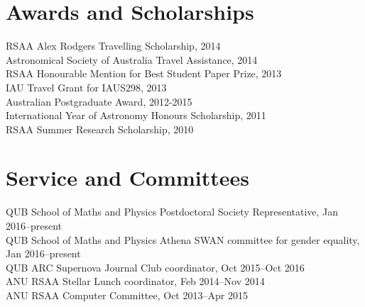 \documentclass[11pt]{res} %
\begin{document}
\begin{resume}
\section{Awards and Scholarships}
  RSAA Alex Rodgers Travelling Scholarship, 2014\\
  Astronomical Society of Australia Travel Assistance, 2014\\
  RSAA Honourable Mention for Best Student Paper Prize, 2013\\
  IAU Travel Grant for IAUS298, 2013\\
  Australian Postgraduate Award, 2012-2015\\
  International Year of Astronomy Honours Scholarship, 2011\\
  RSAA Summer Research Scholarship, 2010

\section{Service and Committees}
	QUB School of Maths and Physics Postdoctoral Society Representative, Jan 2016--present\\
	QUB School of Maths and Physics Athena SWAN committee for gender equality, Jan 2016--present\\
	QUB ARC Supernova Journal Club coordinator, Oct 2015--Oct 2016\\
	ANU RSAA Stellar Lunch coordinator, Feb 2014--Nov 2014\\
	ANU RSAA Computer Committee, Oct 2013--Apr 2015


\end{resume}
\end{document}
